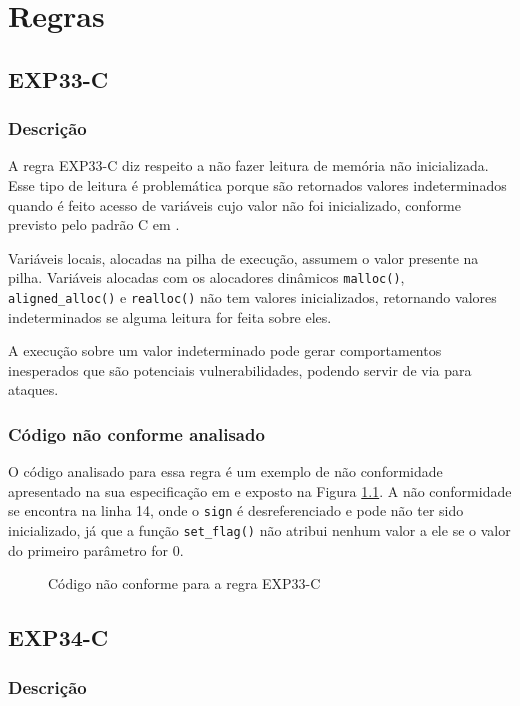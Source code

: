 \chapter{Regras}
\label{cap2}
\section{EXP33-C}
\subsection{Descrição}

A regra EXP33-C diz respeito a não fazer leitura de memória não inicializada. Esse tipo de leitura é problemática porque são retornados valores indeterminados quando é feito acesso de variáveis cujo valor não foi inicializado, conforme previsto pelo padrão C em \cite{ISO-C}.

Variáveis locais, alocadas na pilha de execução, assumem o valor presente na pilha. Variáveis alocadas com os alocadores dinâmicos \texttt{malloc()}, \texttt{aligned\_alloc()} e \texttt{realloc()} não tem valores inicializados, retornando valores indeterminados se alguma leitura for feita sobre eles.

A execução sobre um valor indeterminado pode gerar comportamentos inesperados que são potenciais vulnerabilidades, podendo servir de via para ataques.

\subsection{Código não conforme analisado}

O código analisado para essa regra é um exemplo de não conformidade apresentado na sua especificação em \cite{ccert} e exposto na Figura \ref{fig:EXP33-C}. A não conformidade se encontra na linha 14, onde o \texttt{sign} é desreferenciado e pode não ter sido inicializado, já que a função \texttt{set\_flag()} não atribui nenhum valor a ele se o valor do primeiro parâmetro for 0.

\begin{figure}[h!]
  \centering
  
  \caption{Código não conforme para a regra EXP33-C}
\label{fig:EXP33-C}
\end{figure}

\section{EXP34-C}
\subsection{Descrição}

